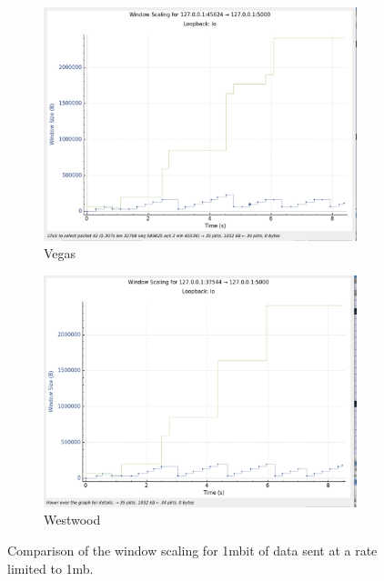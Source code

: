 \documentclass{report}
\begin{document}
\begin{figure}[H]
    \begin{subfigure}[b]{0.45\textwidth}
        \centering
        \includegraphics[width=\textwidth]{Pics/Vegas/r1mbit_s1m_ws}
        \caption{Vegas}
    \end{subfigure}
    \hfill
    \begin{subfigure}[b]{0.45\textwidth}
        \centering
        \includegraphics[width=\textwidth]{Pics/Westwood/r1mbit_s1m_ws}
        \caption{Westwood}
    \end{subfigure}
    \caption{Comparison of the window scaling for 1mbit of data sent at a rate limited to 1mb.}
    \label{fig:four_images}
\end{figure}
\end{document}
